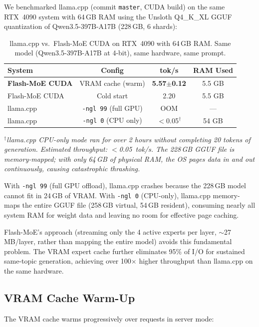 \documentclass[11pt]{article}
\begin{document}
We benchmarked llama.cpp (commit \texttt{master}, CUDA build) on the same RTX~4090 system with 64\,GB RAM using the Unsloth Q4\_K\_XL GGUF quantization of Qwen3.5-397B-A17B (228\,GB, 6 shards):

\begin{table}[h]
\centering
\small
\caption{llama.cpp vs.\ Flash-MoE CUDA on RTX~4090 with 64\,GB RAM. Same model (Qwen3.5-397B-A17B at 4-bit), same hardware, same prompt.}
\label{tab:llamacpp}
\begin{tabular}{lccc}
\toprule
\textbf{System} & \textbf{Config} & \textbf{tok/s} & \textbf{RAM Used} \\
\midrule
\textbf{Flash-MoE CUDA} & VRAM cache (warm) & \textbf{5.57$\pm$0.12} & 5.5 GB \\
Flash-MoE CUDA & Cold start & 2.20 & 5.5 GB \\
\midrule
llama.cpp & \texttt{-ngl 99} (full GPU) & OOM & --- \\
llama.cpp & \texttt{-ngl 0} (CPU only) & $<$0.05$^\dagger$ & 54 GB \\
\bottomrule
\end{tabular}
\end{table}

$^\dagger$\textit{llama.cpp CPU-only mode ran for over 2 hours without completing 20 tokens of generation. Estimated throughput: $<$0.05~tok/s. The 228\,GB GGUF file is memory-mapped; with only 64\,GB of physical RAM, the OS pages data in and out continuously, causing catastrophic thrashing.}

With \texttt{-ngl 99} (full GPU offload), llama.cpp crashes because the 228\,GB model cannot fit in 24\,GB of VRAM. With \texttt{-ngl 0} (CPU-only), llama.cpp memory-maps the entire GGUF file (258\,GB virtual, 54\,GB resident), consuming nearly all system RAM for weight data and leaving no room for effective page caching.

Flash-MoE's approach (streaming only the 4 active experts per layer, $\sim$27\,MB/layer, rather than mapping the entire model) avoids this fundamental problem. The VRAM expert cache further eliminates 95\% of I/O for sustained same-topic generation, achieving over 100$\times$ higher throughput than llama.cpp on the same hardware.

\subsection{VRAM Cache Warm-Up}

The VRAM cache warms progressively over requests in server mode:
\end{document}
